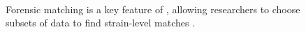 \begin{figure}
    \centering
    \\
    \caption{Forensic matching is a key feature of \cplop{}, allowing researchers to choose subsets of \cplop{} data \protect{} to find strain-level matches \protect{}.}
    \label{fig:forensic}
\end{figure}
